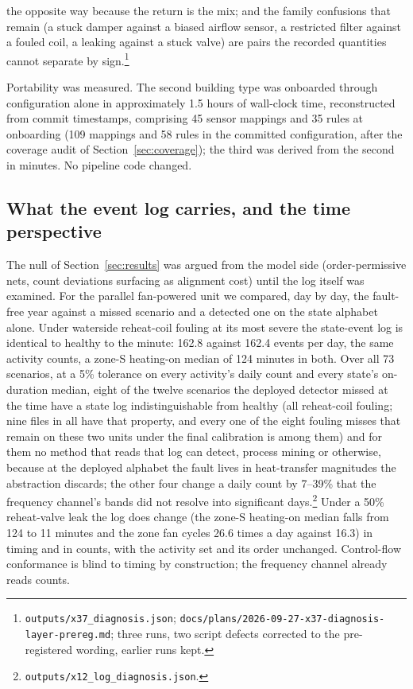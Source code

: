 \documentclass[11pt,letterpaper]{article}
\begin{document}
the opposite way because the return is the mix; and the family confusions that remain (a stuck damper against a biased airflow sensor, a restricted filter against a fouled coil, a leaking against a stuck valve) are pairs the recorded quantities cannot separate by sign.\footnote{\texttt{outputs/x37\_diagnosis.json}; \texttt{docs/plans/2026-09-27-x37-diagnosis-layer-prereg.md}; three runs, two script defects corrected to the pre-registered wording, earlier runs kept.}

Portability was measured. The second building type was onboarded through configuration alone in approximately 1.5 hours of wall-clock time, reconstructed from commit timestamps, comprising 45 sensor mappings and 35 rules at onboarding (109 mappings and 58 rules in the committed configuration, after the coverage audit of Section~\ref{sec:coverage}); the third was derived from the second in minutes. No pipeline code changed.

\subsection{What the event log carries, and the time perspective}
\label{sec:timeperspective}

The null of Section~\ref{sec:results} was argued from the model side (order-permissive nets, count deviations surfacing as alignment cost) until the log itself was examined. For the parallel fan-powered unit we compared, day by day, the fault-free year against a missed scenario and a detected one on the state alphabet alone. Under waterside reheat-coil fouling at its most severe the state-event log is identical to healthy to the minute: 162.8 against 162.4 events per day, the same activity counts, a zone-S heating-on median of 124 minutes in both. Over all 73 scenarios, at a 5\% tolerance on every activity's daily count and every state's on-duration median, eight of the twelve scenarios the deployed detector missed at the time have a state log indistinguishable from healthy (all reheat-coil fouling; nine files in all have that property, and every one of the eight fouling misses that remain on these two units under the final calibration is among them) and for them no method that reads that log can detect, process mining or otherwise, because at the deployed alphabet the fault lives in heat-transfer magnitudes the abstraction discards; the other four change a daily count by 7--39\% that the frequency channel's bands did not resolve into significant days.\footnote{\texttt{outputs/x12\_log\_diagnosis.json}.} Under a 50\% reheat-valve leak the log does change (the zone-S heating-on median falls from 124 to 11 minutes and the zone fan cycles 26.6 times a day against 16.3) in timing and in counts, with the activity set and its order unchanged. Control-flow conformance is blind to timing by construction; the frequency channel already reads counts.
\end{document}

